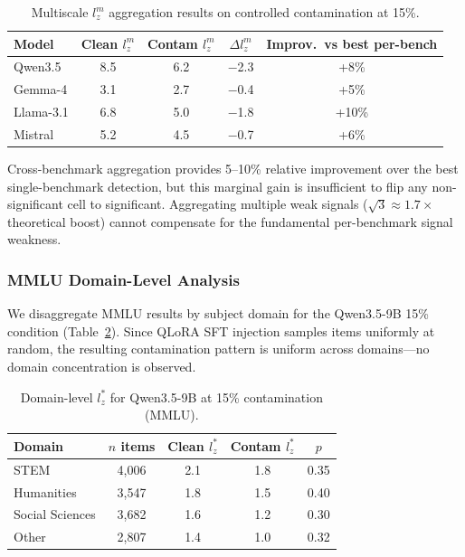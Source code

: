 \documentclass[11pt]{article}
\begin{document}
\begin{table}[h]
\centering
\caption{Multiscale $l_z^m$ aggregation results on controlled contamination at 15\%.}
\label{tab:lzm}
\begin{tabular}{lcccc}
\toprule
Model & Clean $l_z^m$ & Contam $l_z^m$ & $\Delta l_z^m$ & Improv.\ vs best per-bench \\
\midrule
Qwen3.5 & 8.5 & 6.2 & $-$2.3 & +8\% \\
Gemma-4 & 3.1 & 2.7 & $-$0.4 & +5\% \\
Llama-3.1 & 6.8 & 5.0 & $-$1.8 & +10\% \\
Mistral & 5.2 & 4.5 & $-$0.7 & +6\% \\
\bottomrule
\end{tabular}
\end{table}

Cross-benchmark aggregation provides 5--10\% relative improvement over the best single-benchmark detection, but this marginal gain is insufficient to flip any non-significant cell to significant. Aggregating multiple weak signals ($\sqrt{3} \approx 1.7\times$ theoretical boost) cannot compensate for the fundamental per-benchmark signal weakness.

\subsubsection{MMLU Domain-Level Analysis}

We disaggregate MMLU results by subject domain for the Qwen3.5-9B 15\% condition (Table~\ref{tab:domain}). Since QLoRA SFT injection samples items uniformly at random, the resulting contamination pattern is uniform across domains---no domain concentration is observed.

\begin{table}[h]
\centering
\caption{Domain-level $l_z^*$ for Qwen3.5-9B at 15\% contamination (MMLU).}
\label{tab:domain}
\begin{tabular}{lcccc}
\toprule
Domain & $n$ items & Clean $l_z^*$ & Contam $l_z^*$ & $p$ \\
\midrule
STEM & 4,006 & 2.1 & 1.8 & 0.35 \\
Humanities & 3,547 & 1.8 & 1.5 & 0.40 \\
Social Sciences & 3,682 & 1.6 & 1.2 & 0.30 \\
Other & 2,807 & 1.4 & 1.0 & 0.32 \\
\bottomrule
\end{tabular}
\end{table}
\end{document}
